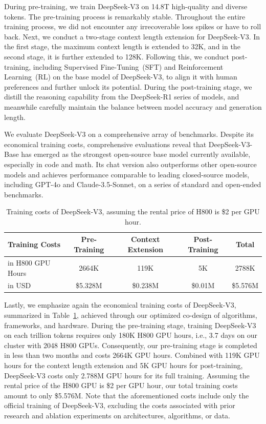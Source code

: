 \documentclass[11pt, a4paper, logo, copyright, nonumbering]{deepseek}
\newcommand{\dsviii}{DeepSeek-V3}
\begin{document}
\begin{CJK*}{UTF8}{gbsn}
During pre-training, we train \dsviii{} on 14.8T high-quality and diverse tokens. 
The pre-training process is remarkably stable. 
Throughout the entire training process, we did not encounter any irrecoverable loss spikes or have to roll back.
Next, we conduct a two-stage context length extension for \dsviii{}. In the first stage, the maximum context length is extended to 32K, and in the second stage, it is further extended to 128K. 
Following this, we conduct post-training, including Supervised Fine-Tuning~(SFT) and Reinforcement Learning~(RL) on the base model of \dsviii{}, to align it with human preferences and further unlock its potential. 
During the post-training stage, we distill the reasoning capability from the DeepSeek-R1 series of models, and meanwhile carefully maintain the balance between model accuracy and generation length. 

We evaluate \dsviii{} on a comprehensive array of benchmarks. 
Despite its economical training costs, comprehensive evaluations reveal that \dsviii{}-Base has emerged as the strongest open-source base model currently available, especially in code and math. 
Its chat version also outperforms other open-source models and achieves performance comparable to leading closed-source models, including GPT-4o and Claude-3.5-Sonnet, on a series of standard and open-ended benchmarks. 

\begin{table}[t]
    \centering
    \setlength{\tabcolsep}{6pt}
    \begin{tabular}{l | c c c | c}
        \toprule
        \textbf{Training Costs} & \textbf{Pre-Training} & \textbf{Context Extension} & \textbf{Post-Training} & \textbf{Total} \\
        \midrule
        in H800 GPU Hours & 2664K & 119K & 5K & 2788K \\
        in USD & \$5.328M & \$0.238M & \$0.01M & \$5.576M \\
        \bottomrule
    \end{tabular}
    \caption{
    Training costs of \dsviii{}, assuming the rental price of H800 is \$2 per GPU hour.
    }
    \label{tab:cost}
\end{table}

Lastly, we emphasize again the economical training costs of \dsviii{}, summarized in Table~\ref{tab:cost}, achieved through our optimized co-design of algorithms, frameworks, and hardware. 
During the pre-training stage, training \dsviii{} on each trillion tokens requires only 180K H800 GPU hours, i.e., 3.7 days on our cluster with 2048 H800 GPUs. 
Consequently, our pre-training stage is completed in less than two months and costs 2664K GPU hours.
Combined with 119K GPU hours for the context length extension and 5K GPU hours for post-training, \dsviii{} costs only 2.788M GPU hours for its full training. 
Assuming the rental price of the H800 GPU is \$2 per GPU hour, our total training costs amount to only \$5.576M.
Note that the aforementioned costs include only the official training of \dsviii{}, excluding the costs associated with prior research and ablation experiments on architectures, algorithms, or data. 


\end{CJK*}
\end{document}
